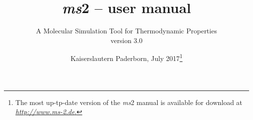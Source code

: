 \documentclass[%
paper=A4,               %
twoside=false,          %
fontsize=11pt,          %
headings=normal,        %
parskip=half+,          %
numbers=noenddot,       %
captions=tableheading,  %
bibliography=totoc,     %
listof=totoc,           %
index=totoc             %
]
{scrbook}               %
\title{\textit{ms}2 -- user manual\footnotetext{Main author: Simon Stephan}  \\[5pt] }
\subtitle{A Molecular Simulation Tool for Thermodynamic Properties \\[40pt] \huge version 3.0}
\date{Kaiserslautern Paderborn, July 2017\footnote{The most up-tp-date version of the \textit{ms}2 manual is available for download at  \href{http://www.ms-2.de}{\textit{http://www.ms-2.de}.} }\\[400pt]}
\begin{document}
%

\singlespacing
\frontmatter

\maketitle

\tableofcontents

%

\singlespacing
\mainmatter









%
% 





%

\printbibliography

\appendix

%


\backmatter



\renewcommand{\indexname}{Stichwortverzeichnis}
\printindex
\end{document}
